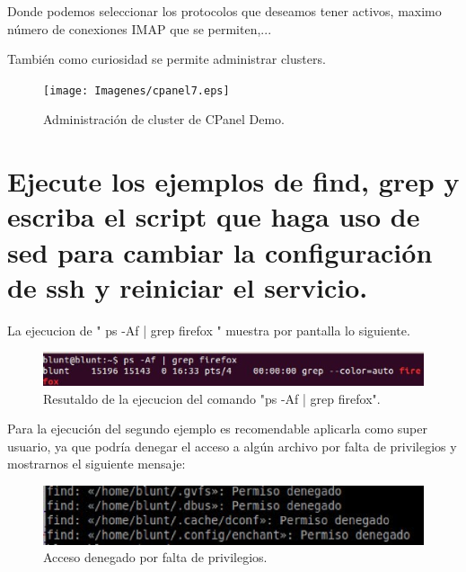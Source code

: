 Donde podemos seleccionar los protocolos que deseamos tener activos, maximo número de conexiones IMAP que se permiten,...

También como curiosidad se permite administrar clusters.

\begin{figure}[H]
\begin{center}
\texttt{[image: Imagenes/cpanel7.eps]}
\caption{Administración de cluster de CPanel Demo.}
\end{center}
\end{figure}


\section{ Ejecute los ejemplos de find, grep y escriba el script que haga uso de sed para cambiar la configuración de ssh y reiniciar el servicio.}

La ejecucion de " ps -Af | grep firefox " muestra por pantalla lo siguiente.


\begin{figure}[H]
\begin{center}
\includegraphics[scale=0.4]{Imagenes/firefox.eps}
\caption{Resutaldo de la ejecucion del comando "ps -Af | grep firefox".}
\end{center}
\end{figure}

Para la ejecución del segundo ejemplo es recomendable aplicarla como super usuario, ya que podría denegar el acceso a algún archivo por falta de privilegios y mostrarnos el siguiente mensaje:

\begin{figure}[H]
\begin{center}
\includegraphics[scale=0.4]{Imagenes/denegado.eps}
\caption{Acceso denegado por falta de privilegios.}
\end{center}
\end{figure}

